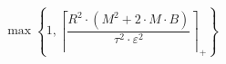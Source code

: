 \[\max\left\{ 1, \left\lceil \frac{R^{2} \cdot \left(M^{2} + 2 \cdot M \cdot B\right)}{\tau^{2} \cdot \varepsilon^{2}} \right\rceil_{+} \right\}\]
